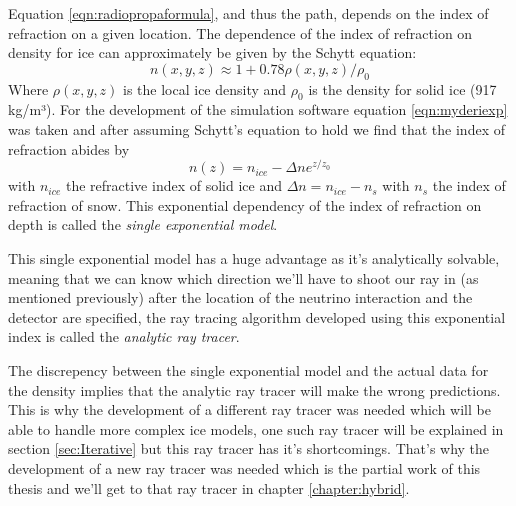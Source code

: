 \documentclass[11pt,a4paper,faculty=we,language=en,doctype=report]{cls/ugent-doc}
\begin{document}
Equation \ref{eqn:radiopropaformula}, and thus the path, depends on the index
of refraction on a given location.  The dependence of the index of refraction
on density for ice can approximately be given by the Schytt equation\cite{Barwick_2018}:
\begin{equation} 
	n(x,y,z) \approx 1 + 0.78\rho(x,y,z)/\rho_0 \label{eqn:Schytt}
\end{equation} 
Where $\rho(x,y,z)$ is the local ice density and $\rho_0$ is the
density for solid ice (917 kg/m³).  For the development of the simulation
software equation \ref{eqn:myderiexp} was taken and after assuming Schytt's
equation to hold we find that the index of refraction abides by
\begin{equation}
	\label{eqn:expn}
	n(z) = n_{ice} - \Delta n e^{z/z_0}
\end{equation}
with $n_{ice}$ the refractive index of solid ice and $\Delta n = n_{ice} - n_s$
with $n_s$ the index of refraction of snow. This exponential dependency of the
index of refraction on depth is called the \textit{single exponential model}.  

This single exponential model has a huge advantage as it's analytically
solvable, meaning that we can know which direction we'll have to shoot our ray
in (as mentioned previously) after the location of the neutrino interaction and
the detector are specified, the ray tracing algorithm developed using this
exponential index is called the \textit{analytic ray tracer}.

The discrepency between the single exponential model and the actual data for
the density implies that the analytic ray tracer will make the wrong
predictions.  This is why the development of a different ray tracer was needed
which will be able to handle more complex ice models, one such ray tracer will
be explained in section \ref{sec:Iterative} but this ray tracer has it's
shortcomings. That's why the development of a new ray tracer was needed which
is the partial work of this thesis and we'll get to that ray tracer in chapter
\ref{chapter:hybrid}.
\end{document}
